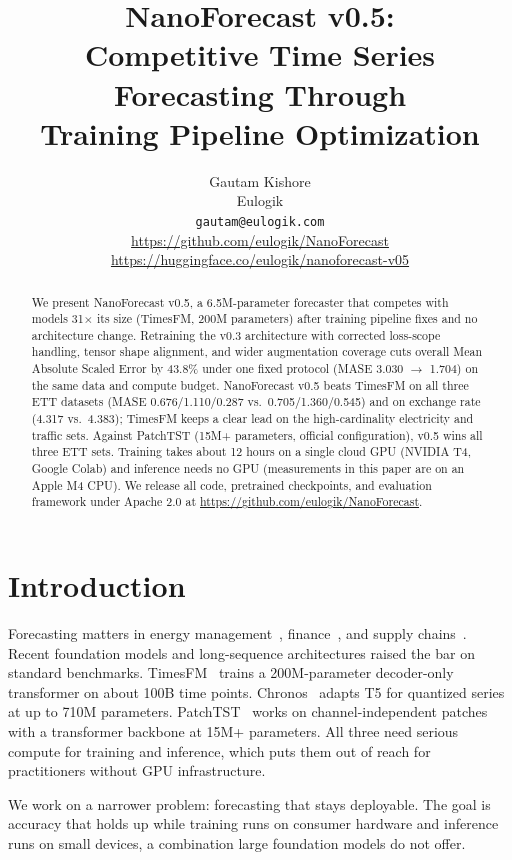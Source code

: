\documentclass[11pt]{article}
\title{NanoForecast v0.5:\\Competitive Time Series Forecasting Through\\Training Pipeline Optimization}
\author{Gautam Kishore \\
Eulogik \\
\texttt{gautam@eulogik.com} \\
\url{https://github.com/eulogik/NanoForecast} \\
\url{https://huggingface.co/eulogik/nanoforecast-v05}
}
\begin{document}
\maketitle

\begin{abstract}
We present NanoForecast v0.5, a 6.5M-parameter forecaster that competes with models 31$\times$ its size (TimesFM, 200M parameters) after training pipeline fixes and no architecture change. Retraining the v0.3 architecture with corrected loss-scope handling, tensor shape alignment, and wider augmentation coverage cuts overall Mean Absolute Scaled Error by 43.8\% under one fixed protocol (MASE 3.030 $\to$ 1.704) on the same data and compute budget. NanoForecast v0.5 beats TimesFM on all three ETT datasets (MASE 0.676/1.110/0.287 vs.\ 0.705/1.360/0.545) and on exchange rate (4.317 vs.\ 4.383); TimesFM keeps a clear lead on the high-cardinality electricity and traffic sets. Against PatchTST (15M+ parameters, official configuration), v0.5 wins all three ETT sets. Training takes about 12 hours on a single cloud GPU (NVIDIA T4, Google Colab) and inference needs no GPU (measurements in this paper are on an Apple M4 CPU). We release all code, pretrained checkpoints, and evaluation framework under Apache 2.0 at \url{https://github.com/eulogik/NanoForecast}.
\end{abstract}

\section{Introduction}
\label{sec:intro}

Forecasting matters in energy management~\cite{ett}, finance~\cite{finance_review}, and supply chains~\cite{supply_chain}. Recent foundation models and long-sequence architectures raised the bar on standard benchmarks. TimesFM~\cite{timesfm} trains a 200M-parameter decoder-only transformer on about 100B time points. Chronos~\cite{chronos} adapts T5 for quantized series at up to 710M parameters. PatchTST~\cite{patchtst} works on channel-independent patches with a transformer backbone at 15M+ parameters. All three need serious compute for training and inference, which puts them out of reach for practitioners without GPU infrastructure.

We work on a narrower problem: forecasting that stays deployable. The goal is accuracy that holds up while training runs on consumer hardware and inference runs on small devices, a combination large foundation models do not offer.
\end{document}
